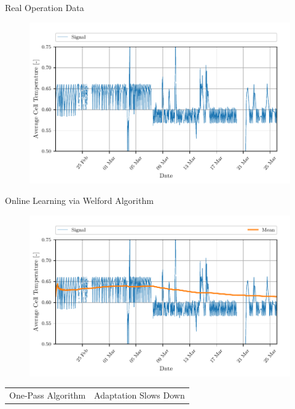 \documentclass[aspectratio=169]{beamer}
\begin{document}
\begin{frame}{Real Operation Data}
    \begin{figure}
        \begin{center}
            \includegraphics[width=0.62\linewidth]{../ilustrate/pc2023/bess/all_signal.pdf}
        \end{center}
    \end{figure}
\end{frame}


\begin{frame}{Online Learning via Welford Algorithm}
    \begin{figure}
        \begin{center}
            \includegraphics[width=0.62\linewidth]{../ilustrate/pc2023/bess/mean_signal.pdf}
        \end{center}
    \end{figure}

    \centering
    \begin{tabular}{c|c}
        {\color{green}{$+$}} One-Pass Algorithm & {\color{red}{$-$}} Adaptation Slows Down \\
    \end{tabular}
\end{frame}
\end{document}
